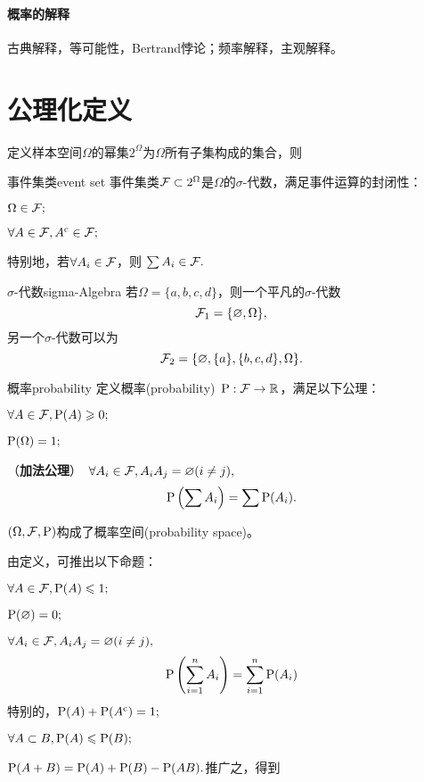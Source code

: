\paragraph{概率的解释}古典解释，等可能性，Bertrand悖论；频率解释，主观解释。

\section{公理化定义}
定义样本空间$\Omega$的幂集$2^\Omega$为$\Omega$所有子集构成的集合，则
\begin{definition}{事件集类}{event set}
	事件集类$\cF\subset 2^\Omega$是$\Omega$的$\sigma$-代数，满足事件运算的封闭性：
	\begin{compactenum}
		\item $\Omega \in \cF;$
		\item $\forall A \in \cF, A\c \in \cF;$
		\item 特别地，若$\forall A_i \in \cF$，则
		$
			\sum A_i \in \cF.
		$
	\end{compactenum}
\end{definition}
\begin{example}{$\sigma$-代数}{sigma-Algebra}
	若$\Omega=\{a,b,c,d\}$，则一个平凡的$\sigma$-代数
	\[
		\cF_1=\{\varnothing, \Omega\},
	\]
	另一个$\sigma$-代数可以为
	\[
		\cF_2=\{\varnothing, \{a\},\{b,c,d\},\Omega\}.
	\]
\end{example}
\begin{definition}{概率}{probability}
	定义概率(probability)~$\P:\cF\to\RR$，满足以下公理：
	\begin{compactenum}
		\item $\forall A\in\cF,\P(A)\geqslant 0;$
		\item $\P (\Omega)=1;$
		\item （\textbf{加法公理}）~$\forall A_i \in \cF,A_iA_j=\varnothing(i\neq j),$
		\begin{align}
			\P\kh{\sum A_i}=\sum\P(A_i).
		\end{align}
	\end{compactenum}
	$(\Omega,\cF,\P)$构成了概率空间(probability space)。
\end{definition}
由定义，可推出以下命题：
\begin{compactenum}
	\item $\forall A\in\cF,\P(A)\leqslant 1;$
	\item $\P(\varnothing)=0;$
	\item $\forall A_i \in \cF,A_iA_j=\varnothing(i\neq j),$
	\[
		\P\kh{\sum_{i=1}^n A_i}=\sum_{i=1}^n\P(A_i)
	\]
	特别的，$\P(A)+\P(A\c)=1;$
	\item $\forall A\subset B,\P(A)\leqslant\P(B);$
	\item $\P(A+B)=\P(A)+\P(B)-\P(AB).$推广之，得到
\end{compactenum}
